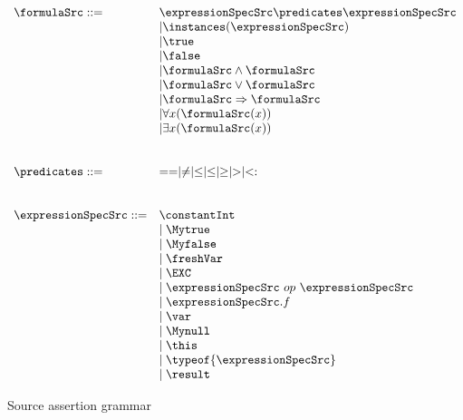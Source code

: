  
\begin{figure}[ht!]
\begin{frameit}
	$$
	\begin{array}{ll}
	\formulaSrc ::= & \expressionSpecSrc \predicates  \expressionSpecSrc \\
	  & \vert  \instances(\expressionSpecSrc)\\
	  & \vert \true \\
	  & \vert  \false \\	
	  & \vert \formulaSrc \wedge \formulaSrc \\
	  & \vert \formulaSrc \vee  \formulaSrc \\
	  & \vert \formulaSrc \Rightarrow \formulaSrc \\
	  & \vert \forall x  (  \formulaSrc(x) ) \\
	  & \vert \exists x  ( \formulaSrc (x))	 \\
      
          & \\
	  & \\
	  \predicates ::=  &   == \mid \neq \mid \leq \mid \le \mid \geq \mid > \mid  <: \\
	  & \\
	  & \\
	  \expressionSpecSrc  ::= & \constantInt  \\
	                          & \mid \Mytrue \\ 
	                          & \mid \Myfalse \\
	                          & \mid \freshVar \\
				  & \mid \EXC    \\
				  & \mid \expressionSpecSrc \ op \ \expressionSpecSrc \\  
				  & \mid \expressionSpecSrc.f \\
				  & \mid \var \\
  			          & \mid \Mynull  \\
				  & \mid \this \\
	                          & \mid \typeof{\expressionSpecSrc} \\
	                          & \mid \result
                                  
	\end{array}
	$$
\caption{\sc Source assertion grammar}
\label{formulasSrc:grammar}
\end{frameit}
\end{figure}

